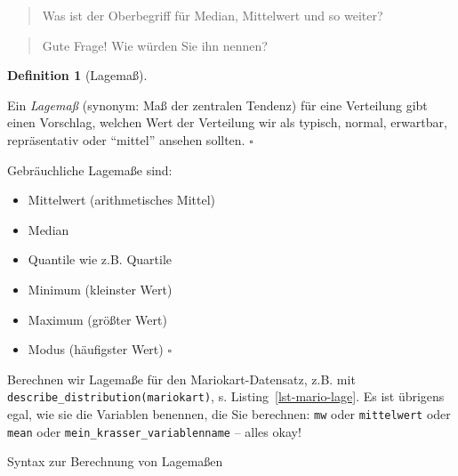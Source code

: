 \documentclass[
  letterpaper,
  oneside,
  open=any]{scrbook}
\newenvironment{Shaded}{\begin{snugshade}}{\end{snugshade}}
\newcommand{\CommentTok}[1]{\textcolor[rgb]{0.37,0.37,0.37}{#1}}
\newcommand{\FunctionTok}[1]{\textcolor[rgb]{0.28,0.35,0.67}{#1}}
\newcommand{\NormalTok}[1]{\textcolor[rgb]{0.00,0.23,0.31}{#1}}
\newcommand{\SpecialCharTok}[1]{\textcolor[rgb]{0.37,0.37,0.37}{#1}}
\providecommand{\tightlist}{%
  \setlength{\itemsep}{0pt}\setlength{\parskip}{0pt}}\usepackage{longtable,booktabs,array}
\theoremstyle{definition}
\theoremstyle{definition}
\theoremstyle{definition}
\newtheorem{definition}{Definition}[chapter]
\theoremstyle{remark}
\begin{document}
\begin{quote}
{} Was ist der Oberbegriff für Median, Mittelwert und so
weiter?
\end{quote}

\begin{quote}
{} Gute Frage! Wie würden Sie ihn nennen?
\end{quote}

\begin{definition}[Lagemaß]\protect\hypertarget{def-lage}{}\label{def-lage}

Ein \emph{Lagemaß} (synonym: Maß der zentralen Tendenz) für eine
Verteilung gibt einen Vorschlag, welchen Wert der Verteilung wir als
typisch, normal, erwartbar, repräsentativ oder \enquote{mittel} ansehen
sollten. \(\square\)

\end{definition}

Gebräuchliche Lagemaße sind:

\begin{itemize}
\tightlist
\item
  Mittelwert (arithmetisches Mittel)
\item
  Median
\item
  Quantile wie z.B. Quartile
\item
  Minimum (kleinster Wert)
\item
  Maximum (größter Wert)
\item
  Modus (häufigster Wert) \(\square\)
\end{itemize}

Berechnen wir Lagemaße für den Mariokart-Datensatz, z.B. mit
\texttt{describe\_distribution(mariokart)}, s.
Listing~\ref{lst-mario-lage}. Es ist übrigens egal, wie sie die
Variablen benennen, die Sie berechnen: \texttt{mw} oder
\texttt{mittelwert} oder \texttt{mean} oder
\texttt{mein\_krasser\_variablenname} -- alles okay!

\begin{codelisting}

\caption{\label{lst-mario-lage}Syntax zur Berechnung von Lagemaßen}

\centering{

\begin{Shaded}
\begin{Highlighting}[]
\FunctionTok{describe\_distribution}\NormalTok{(mariokart) }\SpecialCharTok{|\textgreater{}}  
  \CommentTok{\# Einige Spalten interessieren uns hier nicht:}
  \FunctionTok{select}\NormalTok{(}\SpecialCharTok{{-}}\NormalTok{Skewness, }\SpecialCharTok{{-}}\NormalTok{Kurtosis, }\SpecialCharTok{{-}}\NormalTok{n, n\_Missing)}
\end{Highlighting}
\end{Shaded}

}

\end{codelisting}%
\end{document}
